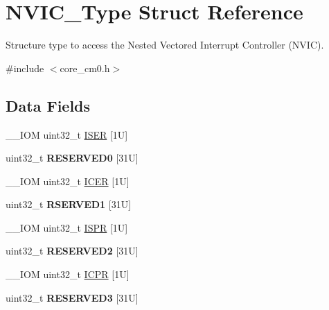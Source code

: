 \hypertarget{struct_n_v_i_c___type}{}\section{N\+V\+I\+C\+\_\+\+Type Struct Reference}
\label{struct_n_v_i_c___type}


Structure type to access the Nested Vectored Interrupt Controller (N\+V\+IC).  




{\ttfamily \#include $<$core\+\_\+cm0.\+h$>$}

\subsection*{Data Fields}
\begin{DoxyCompactItemize}
\item 
\+\_\+\+\_\+\+I\+OM uint32\+\_\+t \mbox{\hyperlink{struct_n_v_i_c___type_a1f970af55366c7caaf51407309f304db}{I\+S\+ER}} \mbox{[}1\+U\mbox{]}
\item 
\mbox{\label{struct_n_v_i_c___type_a99ed1d1bbc9e85b465fb29f40f37aa3a}} 
uint32\+\_\+t {\bfseries R\+E\+S\+E\+R\+V\+E\+D0} \mbox{[}31\+U\mbox{]}
\item 
\+\_\+\+\_\+\+I\+OM uint32\+\_\+t \mbox{\hyperlink{struct_n_v_i_c___type_a3617ee583e4154c0a5901c6965020da9}{I\+C\+ER}} \mbox{[}1\+U\mbox{]}
\item 
\mbox{\label{struct_n_v_i_c___type_aea9a4f17e5fa16fa35ba48cc9f27434b}} 
uint32\+\_\+t {\bfseries R\+S\+E\+R\+V\+E\+D1} \mbox{[}31\+U\mbox{]}
\item 
\+\_\+\+\_\+\+I\+OM uint32\+\_\+t \mbox{\hyperlink{struct_n_v_i_c___type_aecb96022a2971ea637c06798bd131e91}{I\+S\+PR}} \mbox{[}1\+U\mbox{]}
\item 
\mbox{\label{struct_n_v_i_c___type_ad31fe99d09ec7629b716f06af05d0a54}} 
uint32\+\_\+t {\bfseries R\+E\+S\+E\+R\+V\+E\+D2} \mbox{[}31\+U\mbox{]}
\item 
\+\_\+\+\_\+\+I\+OM uint32\+\_\+t \mbox{\hyperlink{struct_n_v_i_c___type_a4d45961e44d2663447bbf0111755c0e7}{I\+C\+PR}} \mbox{[}1\+U\mbox{]}
\item 
\mbox{\label{struct_n_v_i_c___type_a97d3441cfdde21959e8acbbdc358b99f}} 
uint32\+\_\+t {\bfseries R\+E\+S\+E\+R\+V\+E\+D3} \mbox{[}31\+U\mbox{]}

\end{DoxyCompactItemize}
